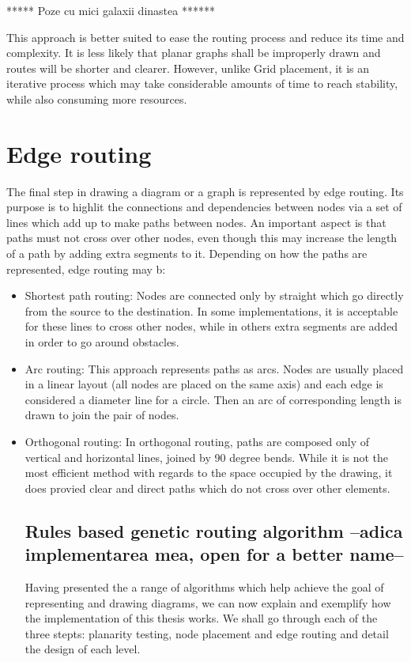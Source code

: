 \begin{itemize}
***** Poze cu mici galaxii dinastea ******

This approach is better suited to ease the routing process and reduce its time and complexity. It is less likely that planar graphs shall be 
improperly drawn and routes will be shorter and clearer. However, unlike Grid placement, it is an iterative process which may take considerable 
amounts of time to reach stability, while also consuming more resources.

\section{Edge routing}

The final step in drawing a diagram or a graph is represented by edge routing. Its purpose is to highlit the connections and dependencies between 
nodes via a set of lines which add up to make paths between nodes. An important aspect is that paths must not cross over other nodes, even though 
this may increase the length of a path by adding extra segments to it. Depending on how the paths are represented, edge routing may b:

\begin{itemize}

\item Shortest path routing: Nodes are connected only by straight which go directly from the source to the destination. In some implementations, it 
is acceptable for these lines to cross other nodes, while in others extra segments are added in order to go around obstacles.
\item Arc routing: This approach represents paths as arcs. Nodes are usually placed in a linear layout (all nodes are placed on the same axis) and 
each edge is considered a diameter line for a circle. Then an arc of corresponding length is drawn to join the pair of nodes.
\item Orthogonal routing: In orthogonal routing, paths are composed only of vertical and horizontal lines, joined by 90 degree bends. While it is 
not the most efficient method with regards to the space occupied by the drawing, it does provied clear and direct paths which do not cross over other 
elements.

\subsection{Rules based genetic routing algorithm --adica implementarea mea, open for a better name--}

Having presented the a range of algorithms which help achieve the goal of representing and drawing diagrams, we can now explain and exemplify how 
the implementation of this thesis works. We shall go through each of the three stepts: planarity testing, node placement and edge routing and 
detail the design of each level.


\end{itemize}
\end{itemize}
